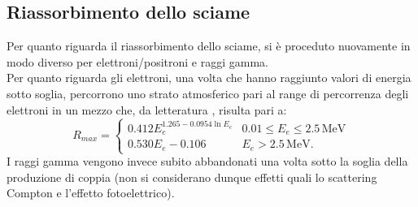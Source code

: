 \documentclass[10pt,a4paper,usenatbib]{article}
\newcommand*{\unit}[1]{\ensuremath{\mathrm{\,#1}}}                              %
\begin{document}
\subsection{Riassorbimento dello sciame}
Per quanto riguarda il riassorbimento dello sciame, si è proceduto nuovamente in modo diverso per elettroni/positroni e raggi gamma. 
\\Per quanto riguarda gli elettroni, una volta che hanno raggiunto valori di energia sotto soglia, percorrono uno strato atmosferico pari al range di percorrenza degli elettroni in un mezzo che, da letteratura \citep{RevModPhys.24.28}, risulta pari a: 
\begin{equation}
R_{max} = \begin{cases} 0.412 E_e^{1.265-0.0954 \ln{E_e}}     & 0.01\le E_e \le 2.5\unit{MeV} \\ 
                                          0.530 E_e - 0.106                                   & E_e > 2.5\unit{MeV}. 
                   \end{cases}
\end{equation}
I raggi gamma vengono invece subito abbandonati una volta sotto la soglia della produzione di coppia (non si considerano dunque effetti quali lo scattering Compton e l'effetto fotoelettrico). 
\end{document}
